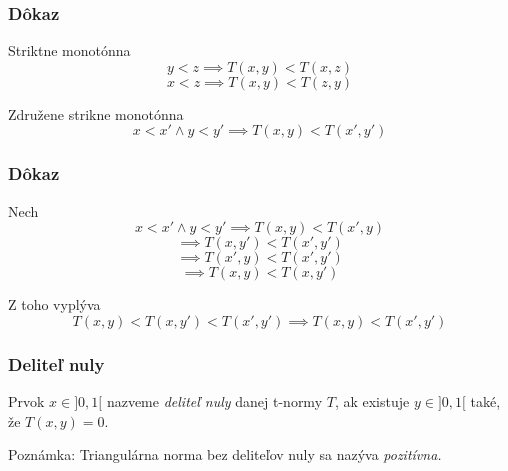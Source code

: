 \documentclass{beamer}
\begin{document}
\begin{frame}
\frametitle{Dôkaz}
Striktne monotónna
$$ y<z \implies T(x,y)<T(x,z)$$
$$ x<z \implies T(x,y)<T(z,y)$$

Združene strikne monotónna
$$ x<x' \land y<y' \implies T(x,y)<T(x',y')$$
\end{frame}

\begin{frame}
\frametitle{Dôkaz}
Nech
$$ x<x' \land y<y' \implies T(x,y)<T(x',y)$$\pause
$$ \implies T(x,y')<T(x',y')$$\pause
$$ \implies T(x',y)<T(x',y')$$\pause
$$ \implies T(x,y)<T(x,y')$$\pause

Z toho vyplýva
$$ T(x,y)<T(x,y')<T(x',y')\implies T(x,y)<T(x',y')$$
\end{frame}


\begin{frame}
\frametitle{Deliteľ nuly}
\begin{definition}
Prvok $x \in ]0,1[$ nazveme {\em deliteľ nuly} danej t-normy $T$, ak
existuje $y \in ]0,1[$ také, že $T(x,y) = 0.$\\
\end{definition}
Poznámka: Triangulárna norma bez deliteľov nuly sa nazýva {\em pozitívna.}
\end{frame}
\end{document}
